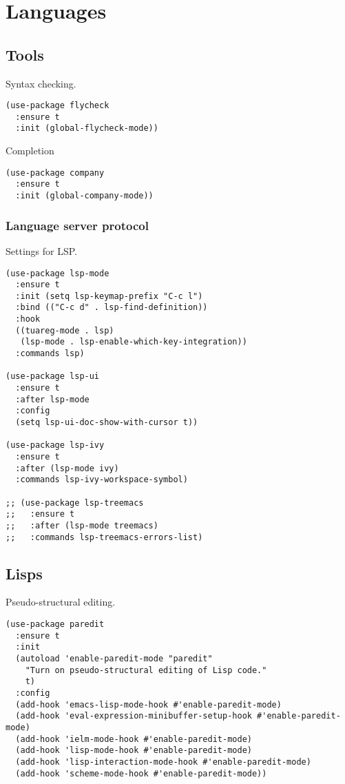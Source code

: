 \documentclass[a4paper,11pt]{article}
\begin{document}
\section{Languages}
\label{sec:org820f8e5}
\subsection{Tools}
\label{sec:orgbe07bbb}
Syntax checking.
\begin{verbatim}
(use-package flycheck
  :ensure t
  :init (global-flycheck-mode))
\end{verbatim}

Completion
\begin{verbatim}
(use-package company
  :ensure t
  :init (global-company-mode))
\end{verbatim}

\subsubsection{Language server protocol}
\label{sec:org192b6db}
Settings for LSP.
\begin{verbatim}
(use-package lsp-mode
  :ensure t
  :init (setq lsp-keymap-prefix "C-c l")
  :bind (("C-c d" . lsp-find-definition))
  :hook
  ((tuareg-mode . lsp)
   (lsp-mode . lsp-enable-which-key-integration))
  :commands lsp)

(use-package lsp-ui
  :ensure t
  :after lsp-mode
  :config
  (setq lsp-ui-doc-show-with-cursor t))

(use-package lsp-ivy
  :ensure t
  :after (lsp-mode ivy)
  :commands lsp-ivy-workspace-symbol)

;; (use-package lsp-treemacs
;;   :ensure t
;;   :after (lsp-mode treemacs)
;;   :commands lsp-treemacs-errors-list)
\end{verbatim}

\subsection{Lisps}
\label{sec:org7b2f10b}
Pseudo-structural editing.
\begin{verbatim}
(use-package paredit
  :ensure t
  :init
  (autoload 'enable-paredit-mode "paredit"
    "Turn on pseudo-structural editing of Lisp code."
    t)
  :config
  (add-hook 'emacs-lisp-mode-hook #'enable-paredit-mode)
  (add-hook 'eval-expression-minibuffer-setup-hook #'enable-paredit-mode)
  (add-hook 'ielm-mode-hook #'enable-paredit-mode)
  (add-hook 'lisp-mode-hook #'enable-paredit-mode)
  (add-hook 'lisp-interaction-mode-hook #'enable-paredit-mode)
  (add-hook 'scheme-mode-hook #'enable-paredit-mode))
\end{verbatim}
\end{document}
